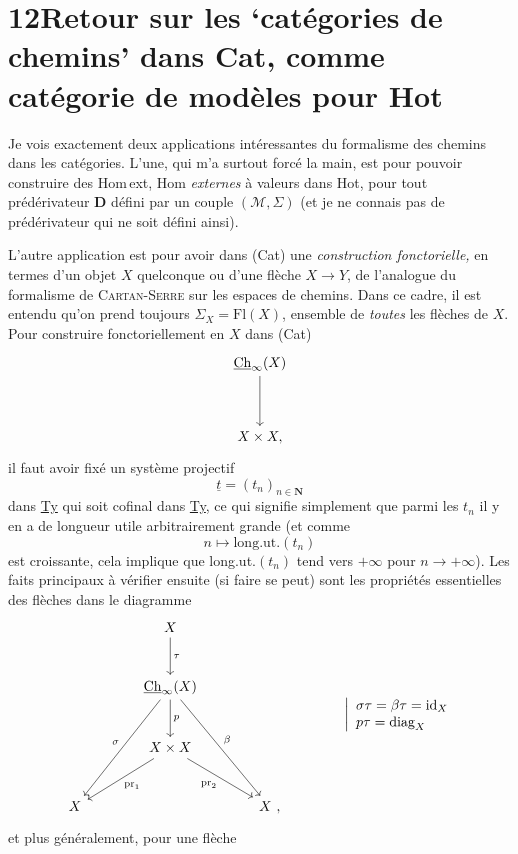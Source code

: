 \section*{12\quad Retour sur les `catégories de chemins' dans \textmd{Cat}, comme catégorie de modèles pour \textmd{Hot}}

Je vois exactement deux applications intéressantes du formalisme des chemins dans les catégories. L'une, qui m'a surtout forcé la main, est pour pouvoir construire des Hom\,ext, Hom \textit{externes} à valeurs dans Hot, pour tout prédérivateur $\mathbf{D}$ défini par un couple $(\mathcal{M},\Sigma)$ (et je ne connais pas de prédérivateur qui ne soit défini ainsi).

L'autre application est pour avoir dans (Cat) une \textit{construction fonctorielle,} en termes d'un objet $X$ quelconque ou d'une flèche $X\longrightarrow Y$, de l'analogue du formalisme de \textsc{Cartan-Serre} sur les espaces de chemins. Dans ce cadre, il est entendu qu'on prend toujours $\Sigma_X=\mathrm{Fl}(X)$, ensemble de \textit{toutes} les flèches de $X$. Pour construire fonctoriellement en $X$ dans (Cat)
\[
\begin{tikzcd}[row sep=huge]
\uCh_\infty(X) \arrow[d] \\
X\times X,
\end{tikzcd}
\]
il faut avoir fixé un système projectif
\[
\underline{t}=(t_n)_{n\in\mathbf{N}}
\]
dans \underline{Ty} qui soit cofinal dans \underline{Ty}, ce qui signifie simplement que parmi les $t_n$ il y en a de longueur utile arbitrairement grande (et comme
\[
n\longmapsto\mathrm{long.ut.}(t_n)
\]
est croissante, cela implique que long.ut.$(t_n)$ tend vers $+\infty$ pour $n\longrightarrow+\infty$). Les faits principaux à vérifier ensuite (si faire se peut) sont les propriétés essentielles des flèches dans le diagramme
\[
\begin{tikzcd}[column sep=large, row sep=large]
& X \arrow[d, "\tau"] & \\
& \uCh_\infty(X) \arrow[d, "p"] \arrow[ddl, "\sigma"'] \arrow[ddr, "\beta"] & \\
& X\times X \arrow[dl, "\mathrm{pr}_1"] \arrow[dr, "\mathrm{pr}_2"'] & \\
X & & X\ ,
\end{tikzcd}
\qquad\qquad
\left|\begin{array}{l}
\sigma\tau=\beta\tau=\mathrm{id}_X\\
p\tau=\mathrm{diag}_X
\end{array}\right.
\]
et plus généralement, pour une flèche

